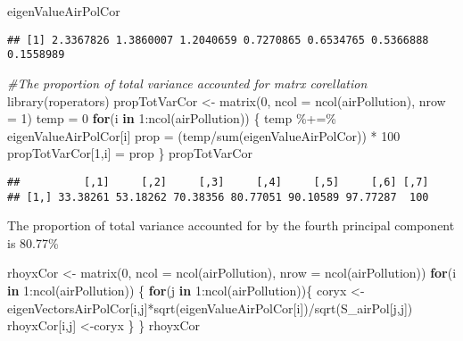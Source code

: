 \documentclass[
]{article}
\newenvironment{Shaded}{\begin{snugshade}}{\end{snugshade}}
\newcommand{\AttributeTok}[1]{\textcolor[rgb]{0.77,0.63,0.00}{#1}}
\newcommand{\CommentTok}[1]{\textcolor[rgb]{0.56,0.35,0.01}{\textit{#1}}}
\newcommand{\ControlFlowTok}[1]{\textcolor[rgb]{0.13,0.29,0.53}{\textbf{#1}}}
\newcommand{\DecValTok}[1]{\textcolor[rgb]{0.00,0.00,0.81}{#1}}
\newcommand{\FunctionTok}[1]{\textcolor[rgb]{0.00,0.00,0.00}{#1}}
\newcommand{\NormalTok}[1]{#1}
\newcommand{\OtherTok}[1]{\textcolor[rgb]{0.56,0.35,0.01}{#1}}
\newcommand{\SpecialCharTok}[1]{\textcolor[rgb]{0.00,0.00,0.00}{#1}}
\begin{document}
\begin{Shaded}
\begin{Highlighting}[]
\NormalTok{eigenValueAirPolCor}
\end{Highlighting}
\end{Shaded}

\begin{verbatim}
## [1] 2.3367826 1.3860007 1.2040659 0.7270865 0.6534765 0.5366888 0.1558989
\end{verbatim}

\begin{Shaded}
\begin{Highlighting}[]
\CommentTok{\#The proportion of total variance accounted for matrx corellation}
\FunctionTok{library}\NormalTok{(roperators)}
\NormalTok{propTotVarCor }\OtherTok{\textless{}{-}} \FunctionTok{matrix}\NormalTok{(}\DecValTok{0}\NormalTok{, }\AttributeTok{ncol =} \FunctionTok{ncol}\NormalTok{(airPollution), }\AttributeTok{nrow =} \DecValTok{1}\NormalTok{)}
\NormalTok{temp }\OtherTok{=} \DecValTok{0}
\ControlFlowTok{for}\NormalTok{(i }\ControlFlowTok{in} \DecValTok{1}\SpecialCharTok{:}\FunctionTok{ncol}\NormalTok{(airPollution))}
\NormalTok{\{}
\NormalTok{  temp }\SpecialCharTok{\%+=\%}\NormalTok{ eigenValueAirPolCor[i]}
\NormalTok{  prop }\OtherTok{=}\NormalTok{ (temp}\SpecialCharTok{/}\FunctionTok{sum}\NormalTok{(eigenValueAirPolCor)) }\SpecialCharTok{*} \DecValTok{100}
\NormalTok{  propTotVarCor[}\DecValTok{1}\NormalTok{,i] }\OtherTok{=}\NormalTok{ prop}
\NormalTok{\}}
\NormalTok{propTotVarCor}
\end{Highlighting}
\end{Shaded}

\begin{verbatim}
##          [,1]     [,2]     [,3]     [,4]     [,5]     [,6] [,7]
## [1,] 33.38261 53.18262 70.38356 80.77051 90.10589 97.77287  100
\end{verbatim}

The proportion of total variance accounted for by the fourth principal
component is 80.77\%

\begin{Shaded}
\begin{Highlighting}[]
\NormalTok{rhoyxCor }\OtherTok{\textless{}{-}} \FunctionTok{matrix}\NormalTok{(}\DecValTok{0}\NormalTok{, }\AttributeTok{ncol =} \FunctionTok{ncol}\NormalTok{(airPollution), }\AttributeTok{nrow =} \FunctionTok{ncol}\NormalTok{(airPollution))}
\ControlFlowTok{for}\NormalTok{(i }\ControlFlowTok{in} \DecValTok{1}\SpecialCharTok{:}\FunctionTok{ncol}\NormalTok{(airPollution))}
\NormalTok{\{}
  \ControlFlowTok{for}\NormalTok{(j }\ControlFlowTok{in} \DecValTok{1}\SpecialCharTok{:}\FunctionTok{ncol}\NormalTok{(airPollution))\{}
\NormalTok{   coryx }\OtherTok{\textless{}{-}}\NormalTok{ eigenVectorsAirPolCor[i,j]}\SpecialCharTok{*}\FunctionTok{sqrt}\NormalTok{(eigenValueAirPolCor[i])}\SpecialCharTok{/}\FunctionTok{sqrt}\NormalTok{(S\_airPol[j,j])  }
\NormalTok{   rhoyxCor[i,j] }\OtherTok{\textless{}{-}}\NormalTok{coryx}
\NormalTok{  \}}
\NormalTok{\}}
\NormalTok{rhoyxCor}
\end{Highlighting}
\end{Shaded}
\end{document}
